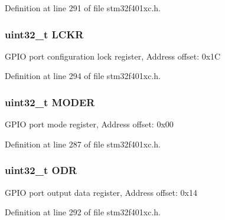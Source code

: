 Definition at line 291 of file stm32f401xc.\+h.

\subsubsection[{\texorpdfstring{L\+C\+KR}{LCKR}}]{ uint32\+\_\+t L\+C\+KR}\hypertarget{struct_g_p_i_o___type_def_a2612a0f4b3fbdbb6293f6dc70105e190}{}\label{struct_g_p_i_o___type_def_a2612a0f4b3fbdbb6293f6dc70105e190}
G\+P\+IO port configuration lock register, Address offset\+: 0x1C 

Definition at line 294 of file stm32f401xc.\+h.

\subsubsection[{\texorpdfstring{M\+O\+D\+ER}{MODER}}]{ uint32\+\_\+t M\+O\+D\+ER}\hypertarget{struct_g_p_i_o___type_def_a2b671a94c63a612f81e0e9de8152d01c}{}\label{struct_g_p_i_o___type_def_a2b671a94c63a612f81e0e9de8152d01c}
G\+P\+IO port mode register, Address offset\+: 0x00 

Definition at line 287 of file stm32f401xc.\+h.

\subsubsection[{\texorpdfstring{O\+DR}{ODR}}]{ uint32\+\_\+t O\+DR}\hypertarget{struct_g_p_i_o___type_def_abff7fffd2b5a718715a130006590c75c}{}\label{struct_g_p_i_o___type_def_abff7fffd2b5a718715a130006590c75c}
G\+P\+IO port output data register, Address offset\+: 0x14 

Definition at line 292 of file stm32f401xc.\+h.

